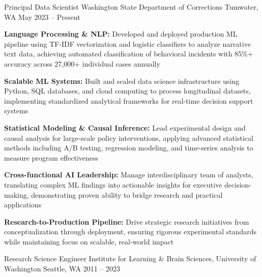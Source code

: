 
\begin{cventries}

  \cventry
    {Principal Data Scientist}
    {Washington State Department of Corrections}
    {Tumwater, WA}
    {May 2023 -- Present}
    {
      \begin{cvitems}
        \item \textbf{Language Processing \& NLP:} Developed and deployed production ML pipeline using TF-IDF vectorization and logistic classifiers to analyze narrative text data, achieving automated classification of behavioral incidents with 85\%+ accuracy across 27,000+ individual cases annually
        \item \textbf{Scalable ML Systems:} Built and scaled data science infrastructure using Python, SQL databases, and cloud computing to process longitudinal datasets, implementing standardized analytical frameworks for real-time decision support systems
        \item \textbf{Statistical Modeling \& Causal Inference:} Lead experimental design and causal analysis for large-scale policy interventions, applying advanced statistical methods including A/B testing, regression modeling, and time-series analysis to measure program effectiveness
        \item \textbf{Cross-functional AI Leadership:} Manage interdisciplinary team of analysts, translating complex ML findings into actionable insights for executive decision-making, demonstrating proven ability to bridge research and practical applications
        \item \textbf{Research-to-Production Pipeline:} Drive strategic research initiatives from conceptualization through deployment, ensuring rigorous experimental standards while maintaining focus on scalable, real-world impact
      \end{cvitems}
    }
  \cventry
    {Research Science Engineer}
    {Institute for Learning \& Brain Sciences, University of Washington}
    {Seattle, WA}
    {2011 -- 2023}

\end{cventries}

